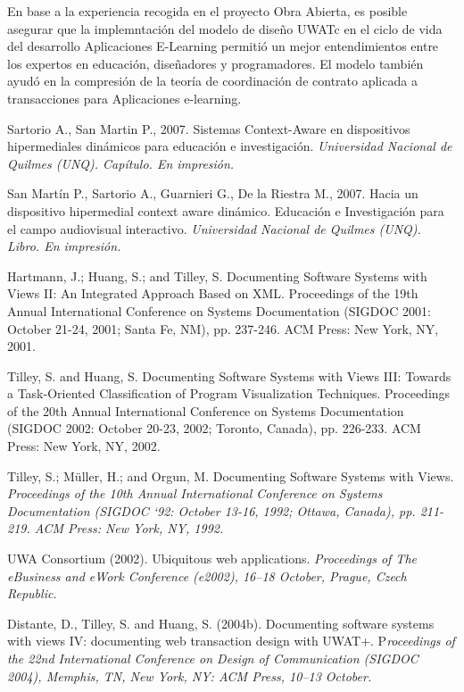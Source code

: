 \documentclass[12 pt,a4paper]{llncs}
\begin{document}
En base a la experiencia recogida en el proyecto Obra Abierta, es posible asegurar que la implemntación del modelo de diseño UWATc en el ciclo de vida del desarrollo Aplicaciones E-Learning permitió un mejor entendimientos entre los expertos en educación, diseñadores y programadores. El modelo también ayudó en la compresión de la teoría de coordinación de contrato aplicada a transacciones para Aplicaciones e-learning.




\begin{thebibliography}{1}

 Sartorio A., San Martin P., 2007. {Sistemas Context-Aware en dispositivos hipermediales dinámicos para educación e investigación}. \textit{Universidad Nacional de Quilmes (UNQ). Capítulo. En impresión.}

 San Martín P., Sartorio A., Guarnieri G., De la Riestra M., 2007. {Hacia un dispositivo hipermedial context aware dinámico. Educación e Investigación para el campo audiovisual interactivo}. \textit{Universidad Nacional de Quilmes (UNQ). Libro. En impresión.}


 Hartmann, J.; Huang, S.; and Tilley, S. {Documenting
Software Systems with Views II: An Integrated Approach
Based on XML.} Proceedings of the 19th Annual
International Conference on Systems Documentation
(SIGDOC 2001: October 21-24, 2001; Santa Fe, NM), pp.
237-246. ACM Press: New York, NY, 2001.

 Tilley, S. and Huang, S. {Documenting Software Systems
with Views III: Towards a Task-Oriented Classification of
Program Visualization Techniques.} Proceedings of the 20th
Annual International Conference on Systems Documentation
(SIGDOC 2002: October 20-23, 2002; Toronto, Canada), pp.
226-233. ACM Press: New York, NY, 2002.

 Tilley, S.; Müller, H.; and Orgun, M. {Documenting
Software Systems with Views.} \textit{Proceedings of the 10th
Annual International Conference on Systems Documentation
(SIGDOC ‘92: October 13-16, 1992; Ottawa, Canada), pp.
211-219. ACM Press: New York, NY, 1992.}

 UWA Consortium (2002). {Ubiquitous web applications.} \textit{Proceedings of The eBusiness and eWork Conference (e2002), 16–18 October, Prague, Czech Republic.}

 Distante, D., Tilley, S. and Huang, S. (2004b). {Documenting software systems with views IV:
documenting web transaction design with UWAT+.} P\textit{roceedings of the 22nd International
Conference on Design of Communication (SIGDOC 2004), Memphis, TN, New York, NY:
ACM Press, 10–13 October.}



\end{thebibliography}
\end{document}

